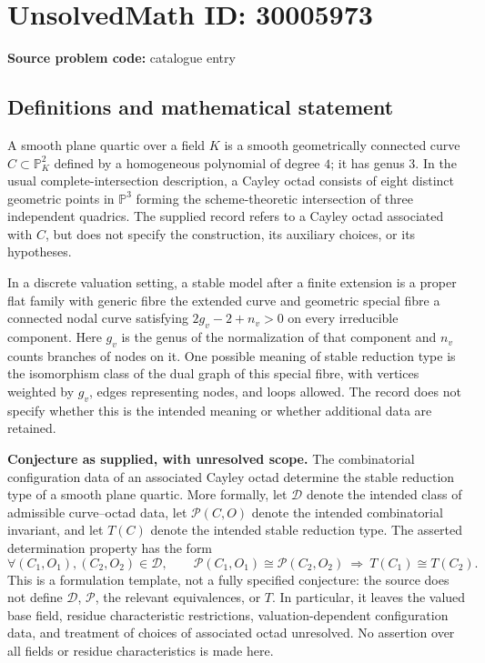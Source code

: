 \documentclass[11pt]{article}
\newcommand{\PP}{\mathbb{P}}
\begin{document}
\section*{UnsolvedMath ID: 30005973}
\textbf{Source problem code:} catalogue entry
\subsection{Definitions and mathematical statement}
A smooth plane quartic over a field \(K\) is a smooth geometrically connected curve \(C\subset\PP^2_K\) defined by a homogeneous polynomial of degree \(4\); it has genus \(3\). In the usual complete-intersection description, a Cayley octad consists of eight distinct geometric points in \(\PP^3\) forming the scheme-theoretic intersection of three independent quadrics. The supplied record refers to a Cayley octad associated with \(C\), but does not specify the construction, its auxiliary choices, or its hypotheses.

In a discrete valuation setting, a stable model after a finite extension is a proper flat family with generic fibre the extended curve and geometric special fibre a connected nodal curve satisfying \(2g_v-2+n_v>0\) on every irreducible component. Here \(g_v\) is the genus of the normalization of that component and \(n_v\) counts branches of nodes on it. One possible meaning of stable reduction type is the isomorphism class of the dual graph of this special fibre, with vertices weighted by \(g_v\), edges representing nodes, and loops allowed. The record does not specify whether this is the intended meaning or whether additional data are retained.

\textbf{Conjecture as supplied, with unresolved scope.} The combinatorial configuration data of an associated Cayley octad determine the stable reduction type of a smooth plane quartic. More formally, let \(\mathscr D\) denote the intended class of admissible curve--octad data, let \(\mathcal P(C,O)\) denote the intended combinatorial invariant, and let \(T(C)\) denote the intended stable reduction type. The asserted determination property has the form
\[
 \forall (C_1,O_1),(C_2,O_2)\in\mathscr D,\qquad
 \mathcal P(C_1,O_1)\cong\mathcal P(C_2,O_2)
 \ \Longrightarrow\ T(C_1)\cong T(C_2).
\]
This is a formulation template, not a fully specified conjecture: the source does not define \(\mathscr D\), \(\mathcal P\), the relevant equivalences, or \(T\). In particular, it leaves the valued base field, residue characteristic restrictions, valuation-dependent configuration data, and treatment of choices of associated octad unresolved. No assertion over all fields or residue characteristics is made here.
\end{document}
